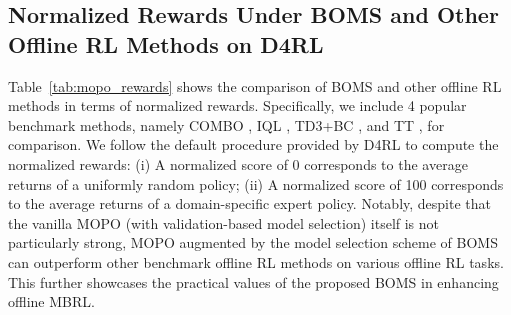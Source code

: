 \subsection{Normalized Rewards Under BOMS and Other Offline RL Methods on D4RL }
Table~\ref{tab:mopo_rewards} shows the comparison of BOMS and other offline RL methods in terms of normalized rewards. Specifically, we include 4 popular benchmark methods, namely COMBO \citep{yu2021combo}, IQL \citep{kostrikov2021implicitq}, TD3+BC \citep{fujimoto2021minimalist}, and TT \citep{janner2021offline}, for comparison. We follow the default procedure provided by D4RL \citep{fu2020d4rl} to compute the normalized rewards: (i) A
normalized score of 0 corresponds to the average returns of a uniformly random policy; (ii) A normalized score of 100 corresponds to the average returns of a domain-specific expert policy. 
Notably, despite that the vanilla MOPO (with validation-based model selection) itself is not particularly strong, MOPO augmented by the model selection scheme of BOMS can outperform other benchmark offline RL methods on various offline RL tasks. This further showcases the practical values of the proposed BOMS in enhancing offline MBRL.


